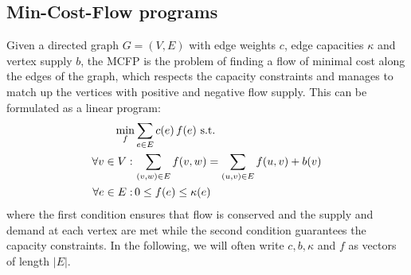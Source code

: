 \documentclass{article}
\begin{document}
\subsection{Min-Cost-Flow programs}
Given a directed graph $G=(V,E)$ with edge weights $c$, edge capacities $\kappa$ and vertex supply $b$, the MCFP is the problem of finding a flow of minimal cost along the edges of the graph, which respects the capacity constraints and manages to match up the vertices with positive and negative flow supply. This can be formulated as a linear program:
\begin{align}\label{MCFP}
\min_f &\sum_{e \in E} c(e)\,f(e) \textnormal{ s.t.}\nonumber\\
\forall v \in V: \,&\sum_{(v,w) \in E} f(v,w) = \sum_{(u,v) \in E} f(u,v) + b(v) \\
\forall	e \in E: \,&0 \leq f(e) \leq \kappa(e) \nonumber
\end{align}
where the first condition ensures that flow is conserved and the supply and demand at each vertex are met while the second condition guarantees the capacity constraints. In the following, we will often write $c, b, \kappa$ and $f$ as vectors of length $|E|$.
\end{document}
